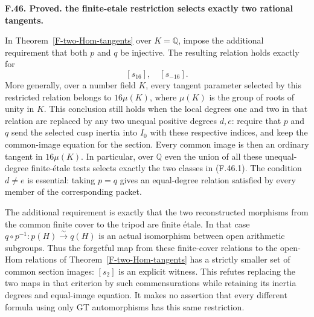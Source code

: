 \documentclass[11pt,oneside]{article}
\makeatletter
\newcounter{statementanchor}
\newenvironment{statement}[3]{%
 \refstepcounter{statementanchor}\def\@currentlabel{#1}%
 \par\addvspace{9pt}\noindent
 \textbf{#1. #2. #3.}\par\nobreak\noindent\ignorespaces
}{\par\addvspace{5pt}}
\makeatother
\begin{document}
\begin{statement}{F.46}{Proved}{the finite-etale restriction selects exactly two rational tangents}
\label{st:F.46}
\label{F-finite-etale-tangents}
In Theorem~\ref{F-two-Hom-tangents} over $K=\mathbb Q$,
impose the additional requirement that both $p$ and $q$ be
injective. The resulting relation holds exactly for
\[
                         [s_{16}],\quad [s_{-16}].
 \tag{F.46.1}
\]
More generally, over a number field $K$, every tangent parameter
selected by this restricted relation belongs to $16\mu(K)$,
where $\mu(K)$ is the group of roots of unity in $K$.
This conclusion still holds when the local degrees one and two
in that relation are replaced by any two unequal positive
degrees $d,e$: require that $p$ and $q$ send the selected cusp
inertia into $I_0$ with these respective indices, and keep the
common-image equation for the section. Every common image is
then an ordinary tangent in $16\mu(K)$. In particular, over
$\mathbb Q$ even the union of all these unequal-degree
finite-\'etale tests selects exactly the two classes in
(F.46.1). The condition $d\ne e$ is essential: taking $p=q$
gives an equal-degree relation satisfied by every member of
the corresponding packet.

The additional requirement is exactly that the two reconstructed
morphisms from the common finite cover to the tripod are finite
\'etale. In that case $q\circ p^{-1}:p(H)\xrightarrow{\sim}q(H)$
is an actual isomorphism between open arithmetic subgroups.
Thus the forgetful map from these finite-cover relations to the
open-Hom relations of Theorem~\ref{F-two-Hom-tangents} has a
strictly smaller set of common section images: $[s_2]$ is an
explicit witness. This refutes replacing the two maps in that
criterion by such commensurations while retaining its inertia
degrees and equal-image equation. It makes no assertion that
every different formula using only GT automorphisms has this
same restriction.
\end{statement}
\end{document}
